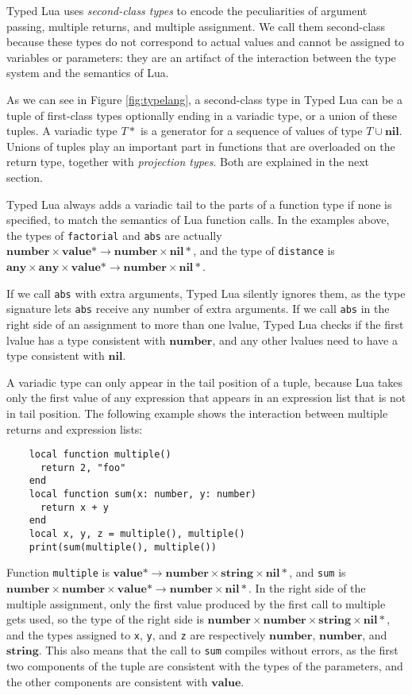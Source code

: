 \documentclass[preprint]{sig-alternate}
\newcommand{\Any}{\mathbf{any}}
\newcommand{\Top}{\mathbf{value}}
\newcommand{\Nil}{\mathbf{nil}}
\newcommand{\Number}{\mathbf{number}}
\newcommand{\String}{\mathbf{string}}
\begin{document}
Typed Lua uses {\em second-class types} to encode the peculiarities
of argument passing, multiple returns, and multiple assignment. We call
them second-class because these types do not correspond to actual
values and cannot be assigned to variables or parameters: they are an
artifact of the interaction between the type system and the semantics of Lua.

As we can see in Figure \ref{fig:typelang}, a second-class
type in Typed Lua can be a tuple of first-class types
optionally ending in a variadic type, or a union of these
tuples. A variadic type $T*$ is a generator for a
sequence of values of type $T \cup \Nil$. Unions of tuples play
an important part in functions that are overloaded on the
return type, together with {\em projection types}. Both are
explained in the next
section.

Typed Lua always adds a
variadic tail to the parts of a function type if none is specified, to match
the semantics of Lua function calls. In the examples above, the types
of {\tt factorial} and {\tt abs} are actually $\Number \times \Top *
 \rightarrow \Number \times \Nil *$, and the type of {\tt distance} is
$\Any \times \Any \times \Top * \rightarrow \Number \times \Nil *$.

If we call {\tt abs} with extra arguments, Typed Lua silently ignores
them, as the type signature lets {\tt abs} receive any number of extra
arguments. If we call {\tt abs} in the right side of an assignment to
more than one lvalue, Typed Lua checks if the first lvalue has a type
consistent with $\Number$, and any other lvalues need to have a type
consistent with $\Nil$.

A variadic type can only appear in the tail position of a tuple,
because Lua takes only the first value of any expression that appears
in an expression list that is not in tail position. The following example
shows the interaction between multiple returns and expression lists:

\begin{verbatim}
    local function multiple()
      return 2, "foo"
    end
    local function sum(x: number, y: number)
      return x + y
    end
    local x, y, z = multiple(), multiple()
    print(sum(multiple(), multiple())
\end{verbatim}

Function {\tt multiple} is
$\Top * \rightarrow \Number \times \String \times \Nil *$,
and {\tt sum} is $\Number \times \Number \times \Top * \rightarrow
\Number \times \Nil *$. In the right side of the multiple assignment,
only the first value produced by the first call to multiple gets used, so
the type of the right side is $\Number \times \Number \times \String \times \Nil*$,
and the types assigned to {\tt x}, {\tt y}, and {\tt z} are respectively $\Number$,
$\Number$, and $\String$. This also means that the call to {\tt sum} compiles
without errors, as the first two components of the tuple are consistent with
the types of the parameters, and the other components are consistent with
$\Top$.
\end{document}
